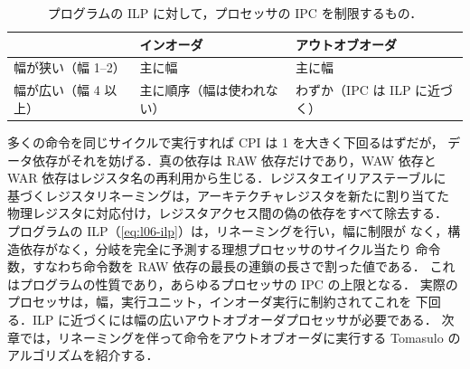 \documentclass[../main.tex]{subfiles}
\begin{document}
\begin{table}[htbp]
  \centering\small
  \caption{プログラムの ILP に対して，プロセッサの IPC を制限するもの．}
  \label{tab:l06-limits}
  \begin{tabular}{@{}lll@{}}
    \toprule
    & インオーダ & アウトオブオーダ \\
    \midrule
    幅が狭い（幅 1--2）   & 主に幅 & 主に幅 \\
    幅が広い（幅 4 以上） & 主に順序（幅は使われない） & わずか（IPC は ILP に近づく） \\
    \bottomrule
  \end{tabular}
\end{table}

\begin{keypoint}[章のまとめ]
  多くの命令を同じサイクルで実行すれば CPI は 1 を大きく下回るはずだが，
  データ依存がそれを妨げる．真の依存は RAW 依存だけであり，WAW 依存と
  WAR 依存はレジスタ名の再利用から生じる．レジスタエイリアステーブルに
  基づくレジスタリネーミングは，アーキテクチャレジスタを新たに割り当てた
  物理レジスタに対応付け，レジスタアクセス間の偽の依存をすべて除去する．
  プログラムの ILP（\cref{eq:l06-ilp}）は，リネーミングを行い，幅に制限が
  なく，構造依存がなく，分岐を完全に予測する理想プロセッサのサイクル当たり
  命令数，すなわち命令数を RAW 依存の最長の連鎖の長さで割った値である．
  これはプログラムの性質であり，あらゆるプロセッサの IPC の上限となる．
  実際のプロセッサは，幅，実行ユニット，インオーダ実行に制約されてこれを
  下回る．ILP に近づくには幅の広いアウトオブオーダプロセッサが必要である．%
  次章では，リネーミングを伴って命令をアウトオブオーダに実行する Tomasulo
  のアルゴリズムを紹介する．
\end{keypoint}
\end{document}
